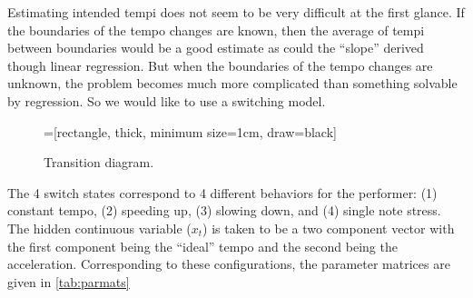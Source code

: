 \documentclass[12pt]{article}
\begin{document}
Estimating intended tempi does not seem to be very difficult at the
first glance. If the boundaries of the tempo changes are known, then
the average of tempi between boundaries would be a good estimate as
could the “slope” derived though linear regression. But when the
boundaries of the tempo changes are unknown, the problem becomes much
more complicated than something solvable by regression. So we would
like to use a switching model.



\begin{figure}[h!]
  \centering
  =[rectangle,
  thick, minimum size=1cm, draw=black]
  \caption{Transition diagram. \label{fig:transmat}}
\end{figure}



The 4 switch states correspond to 4 different behaviors for the
performer: (1) constant tempo, (2) speeding up, (3) slowing down, and
(4) single note stress. The hidden continuous variable ($x_t$) is
taken to be a two component vector with the first component being the
``ideal'' tempo and the second being the acceleration. 
Corresponding to these configurations, the parameter
matrices are given in \autoref{tab:parmats}
\end{document}

